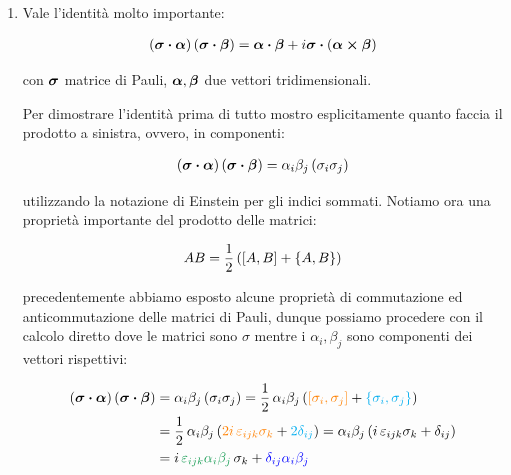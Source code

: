 \begin{enumerate}[label=\arabic*)]
	\item Vale l'identità molto importante:
	
	\begin{align*}
		\qty(\vb*{\sigma} \vdot \vb*{\alpha}) \, \qty(\vb*{\sigma} \vdot \vb*{\beta}) = \vb*{\alpha} \vdot \vb*{\beta} + i \vb*{\sigma} \vdot \qty(\vb*{\alpha} \cp \vb*{\beta})
	\end{align*}
	
		con $\vb*{\sigma}$ matrice di Pauli, $\vb*{\alpha}, \vb*{\beta}$ due vettori tridimensionali.
	
	\begin{myprf}
	
		Per dimostrare l'identità prima di tutto mostro esplicitamente quanto faccia il prodotto a sinistra, ovvero, in componenti:
		
	\begin{align*}
		\qty(\vb*{\sigma} \vdot \vb*{\alpha}) \, \qty(\vb*{\sigma} \vdot \vb*{\beta}) = \alpha_i \beta_j \, \qty(\sigma_i \sigma_j) 
	\end{align*}
	
		utilizzando la notazione di Einstein per gli indici sommati. Notiamo ora una proprietà importante del prodotto delle matrici:
		
	\begin{align*}
		AB = \frac{1}{2} \, \qty( \qty[A, B] + \qty{A, B} ) 
	\end{align*}	
	
		precedentemente abbiamo esposto alcune proprietà di commutazione ed anticommutazione delle matrici di Pauli, dunque possiamo procedere con il calcolo diretto dove le matrici sono $\sigma$ mentre i $\alpha_i, \beta_j$ sono componenti dei vettori rispettivi:
		
	\begin{align*}
		\qty(\vb*{\sigma} \vdot \vb*{\alpha}) \, \qty(\vb*{\sigma} \vdot \vb*{\beta}) & = \alpha_i \beta_j \, \qty(\sigma_i \sigma_j) = \frac{1}{2} \, \alpha_i \beta_j \, \qty(\textcolor{orange}{ \qty[\sigma_i, \sigma_j]} +\textcolor{cyan}{  \qty{\sigma_i, \sigma_j} } ) \\
		& = \frac{1}{2} \, \alpha_i \beta_j \, \qty(    \textcolor{orange}{ 2 i \, \varepsilon_{ijk} \sigma_k } +\textcolor{cyan}{  2 \delta_{ij} }      ) =  \alpha_i \beta_j \, \qty(  i \, \varepsilon_{ijk} \sigma_k  + \delta_{ij}    )  \\
		& =  i \, \textcolor{ForestGreen}{\varepsilon_{ijk}\alpha_i \beta_j}  \,  \sigma_k   + \textcolor{blue}{ \delta_{ij} \alpha_i \beta_j}
	\end{align*}
	

\end{myprf}
\end{enumerate}
